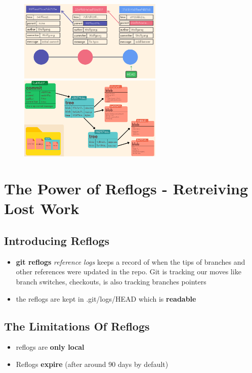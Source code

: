 \documentclass{report}
\newcommand{\warning}{
	{\fontencoding{U}\fontfamily{futs}\selectfont\char 66\relax}
}
\begin{document}
\begin{figure}[H] 
	 \centering 
	 \includegraphics[width=2.7in]{screenshots/2022-07-10T18-43-56Z.png} 
	 \includegraphics[width=2.7in]{screenshots/2022-07-10T18-43-14Z.png} 
\end{figure}



\chapter{The Power of Reflogs - Retreiving Lost Work}


\section{Introducing Reflogs}

\begin{itemize}
	\item \textbf{git reflogs} \textit{reference logs} keeps a record of when the tips of branches and other references were updated in the repo. Git is tracking our moves like branch switches, checkouts, is also tracking branches pointers
	\item the reflogs are kept in .git/logs/HEAD which is \textbf{readable}
\end{itemize}


\section{The Limitations Of Reflogs}

\begin{itemize}
	\item \warning reflogs are \textbf{only local} 
	\item Reflogs \textbf{expire} (after around 90 days by default) 
\end{itemize}
\end{document}
